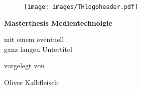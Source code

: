 \begin{titlepage}

\begin{center}

\begin{figure}[!ht]
		\texttt{[image: images/THlogoheader.pdf]}
\end{figure}

\vspace{0.4cm}

\begin{rmfamily}
\begin{huge}
\textbf{Masterthesis Medientechnolgie}\\	
\end{huge}
\vspace{0.5cm}
\begin{LARGE}
mit einem eventuell\\ganz langen Untertitel\\
\end{LARGE}
\end{rmfamily}

\vspace{0.8cm}



\begin{large}
vorgelegt von\\ 
\vspace{0.3cm}
\begin{LARGE}
Oliver Kalbfleisch \\
\end{LARGE}
\end{large}

\vspace{1.2cm}



\end{center}
\end{titlepage}
